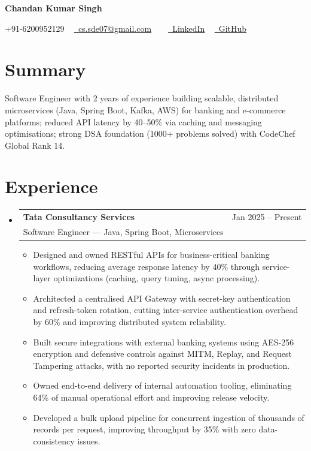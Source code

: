 \documentclass[11pt, letterpaper]{article}
\makeatletter
\newcommand{\resumeItem}[1]{
  \item\small{#1}
}
\newcommand{\resumeSubheading}[4]{
  \needspace{6cm}
  \vspace{-2pt}\item
    \begin{tabular*}{1.0\textwidth}[t]{@{}l@{\extracolsep{\fill}}r@{}}
      \textbf{\large #1} & \small #2 \\
      \small #3 & \textit{\small #4} \\
    \end{tabular*}\vspace{-7pt}
}
\newcommand{\resumeSubHeadingListStart}{\begin{itemize}[leftmargin=0.0in, label={}]}
\newcommand{\resumeSubHeadingListEnd}{\end{itemize}}
\newcommand{\resumeItemListStart}{\begin{itemize}[leftmargin=0.5cm, itemsep=0pt, parsep=0pt, topsep=2pt]\interlinepenalty=10000}
\newcommand{\resumeItemListEnd}{\end{itemize}\vspace{-2pt}}
\makeatother
\begin{document}
\begin{center}
    {\Huge \bfseries Chandan Kumar Singh} \\ \vspace{5pt}
    
    \small \faPhone* +91-6200952129 ~ 
    \href{mailto:cs.sde07@gmail.com}{\faEnvelope~cs.sde07@gmail.com} ~ 
     ~ \href{LinkedIn}{\faLinkedin~LinkedIn}
     ~ \href{GitHub}{\faGithub~GitHub}
    
\end{center}

\section{Summary}
Software Engineer with 2 years of experience building scalable, distributed microservices (Java, Spring Boot, Kafka, AWS) for banking and e-commerce platforms; reduced API latency by 40–50\% via caching and messaging optimisations; strong DSA foundation (1000+ problems solved) with CodeChef Global Rank 14.


\section{Experience}
\resumeSubHeadingListStart
  \resumeSubheading{Tata Consultancy Services}{Jan 2025 -- Present}{Software Engineer — Java, Spring Boot, Microservices}{}
    \resumeItemListStart
      \resumeItem{Designed and owned RESTful APIs for business-critical banking workflows, reducing average response latency by 40\% through service-layer optimizations (caching, query tuning, async processing).}
      \resumeItem{Architected a centralised API Gateway with secret-key authentication and refresh-token rotation, cutting inter-service authentication overhead by 60\% and improving distributed system reliability.}
      \resumeItem{Built secure integrations with external banking systems using AES-256 encryption and defensive controls against MITM, Replay, and Request Tampering attacks, with no reported security incidents in production.}
      \resumeItem{Owned end-to-end delivery of internal automation tooling, eliminating 64\% of manual operational effort and improving release velocity.}
      \resumeItem{Developed a bulk upload pipeline for concurrent ingestion of thousands of records per request, improving throughput by 35\% with zero data-consistency issues.}
    \resumeItemListEnd
\resumeSubHeadingListEnd
\end{document}
